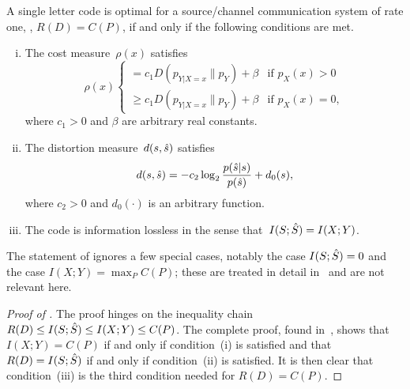 \begin{theorem}
  \label{thm:tcntcbwmatch}
  A single letter code is optimal for a source/channel communication system of
  rate one, \ie, $R(D) = C(P)$, if and only if the following conditions are
  met.
  \begin{enumerate}[(i)]
    \item The cost measure~$\rho(x)$ satisfies
      \begin{equation}
        \label{eq:optcost}
        \rho(x)
        \begin{cases}
          = c_1 D(p_{Y|X=x} \| p_Y) + \beta & \text{if $p_X(x) > 0$} \\
          \ge c_1 D(p_{Y|X=x} \| p_Y) + \beta & \text{if $p_X(x) = 0$},
        \end{cases}
      \end{equation}
      where $c_1 > 0$ and $\beta$ are arbitrary real constants.

    \item The distortion measure~$d(s,{\hat{s}})$ satisfies
      \begin{equation}
        \label{eq:optdist}
        d(s,{\hat{s}}) = - c_2 \log_2 \frac{p({\hat{s}}|s)}{p({\hat{s}})} + d_0(s),
      \end{equation}
      where $c_2 > 0$ and $d_0(\cdot)$ is an arbitrary function.

    \item The code is information lossless in the sense that~$I(S;{\hat{S}}) =
      I(X;Y)$.
  \end{enumerate}
\end{theorem}

\begin{remark}
  \label{rem:tcntcrug}
  The statement of  ignores a few special cases,
  notably the case $I(S;{\hat{S}}) = 0$ and the case $I(X;Y) = \max_P C(P)$; these are
  treated in detail in~\cite{GastparRV2003} and are not relevant here.
\end{remark}

\begin{proof}[Proof of ]
  The proof hinges on the inequality chain $R(D) \le I(S;{\hat{S}}) \le I(X;Y) \le
  C(P)$. The complete proof, found in~\cite{GastparRV2003}, shows that $I(X;Y) =
  C(P)$ if and only if condition~(i) is satisfied and that $R(D) = I(S;{\hat{S}})$ if
  and only if condition~(ii) is satisfied. It is then clear that condition~(iii)
  is the third condition needed for $R(D) = C(P)$.
\end{proof}

